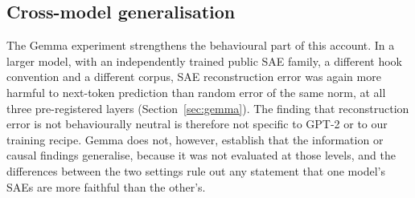 \subsection{Cross-model generalisation}\label{sec:disc-gemma}

The Gemma experiment strengthens the behavioural part of this account. In a larger model, with an independently
trained public SAE family, a different hook convention and a different corpus, SAE reconstruction error was again more
harmful to next-token prediction than random error of the same norm, at all three pre-registered layers
(Section~\ref{sec:gemma}). The finding that reconstruction error is not behaviourally neutral is therefore not specific
to GPT-2 or to our training recipe. Gemma does not, however, establish that the information or causal findings
generalise, because it was not evaluated at those levels, and the differences between the two settings rule out any
statement that one model's SAEs are more faithful than the other's.
